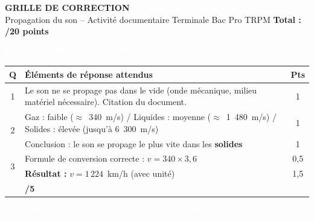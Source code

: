 \documentclass[10pt,a4paper]{article}
\newcommand{\exotitle}[2]{%
  \noindent\colorbox{exoheader}{%
    \parbox{\dimexpr\linewidth-2\fboxsep\relax}{%
      \textcolor{white}{\textbf{\large #1 \hfill #2}}%
    }%
  }%
}
\begin{document}
\begin{center}
  {\LARGE\textbf{GRILLE DE CORRECTION}}\\[1mm]
  {\large Propagation du son -- Activité documentaire \hspace{1cm} Terminale Bac Pro TRPM \hspace{1cm} \textbf{Total : /20 points}}
\end{center}

\vspace{3mm}

\exotitle{Partie A -- Nature et propriétés du son}{/5 pts}

\vspace{1mm}

\begin{tabularx}{\linewidth}{|c|X|c|}
  \hline
  \rowcolor{exolight}
  \textbf{Q} & \textbf{Éléments de réponse attendus} & \textbf{Pts} \\
  \hline
  1
  & Le son ne se propage pas dans le vide (onde mécanique, milieu matériel nécessaire). Citation du document.
  & 1 \\
  \hline
  \multirow{2}{*}{2}
  & Gaz : faible ($\approx$~340~m/s) / Liquides : moyenne ($\approx$~1~480~m/s) / Solides : élevée (jusqu'à 6~300~m/s)
  & 1 \\
  \cline{2-3}
  & Conclusion : le son se propage le plus vite dans les \textbf{solides}
  & 1 \\
  \hline
  \multirow{2}{*}{3}
  & Formule de conversion correcte : $v = 340 \times 3{,}6$
  & 0{,}5 \\
  \cline{2-3}
  & \textbf{Résultat :} $v = 1\,224$~km/h (avec unité)
  & 1{,}5 \\
  \hline
  \rowcolor{totalrow}
  \multicolumn{2}{|r|}{\textbf{Sous-total Partie A}} & \textbf{/5} \\
  \hline
\end{tabularx}

\vspace{4mm}

\exotitle{Partie B -- Célérité dans les matériaux et CND}{/6 pts}

\vspace{1mm}
\end{document}
